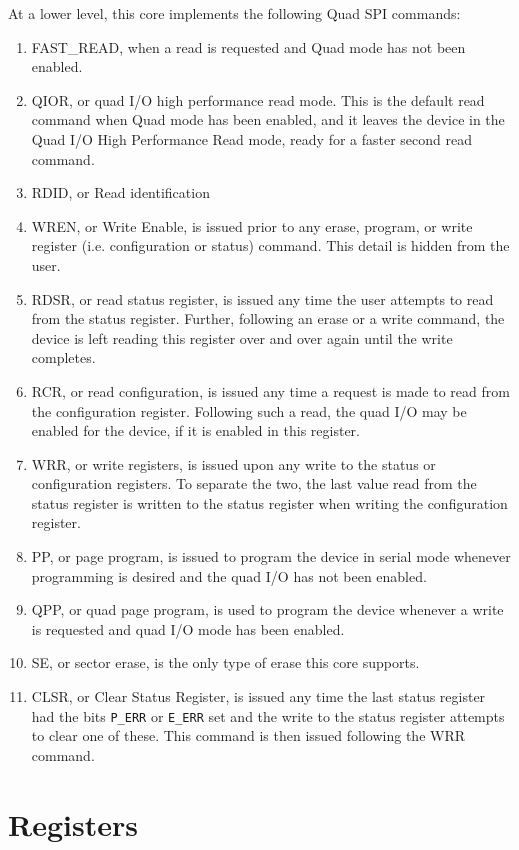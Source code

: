 \documentclass{gqtekspec}
\begin{document}
At a lower level, this core implements the following Quad SPI commands:
\begin{enumerate}
\item FAST\_READ, when a read is requested and Quad mode has not been enabled.
\item QIOR, or quad I/O high performance read mode.  This is the default read
	command when Quad mode has been enabled, and it leaves the device
	in the Quad I/O High Performance Read mode, ready for a faster second
	read command.
\item RDID, or Read identification
\item WREN, or Write Enable, is issued prior to any erase, program, or
		write register (i.e. configuration or status) command.
	This detail is hidden from the user.
\item RDSR, or read status register, is issued any time the user attempts
	to read from the status register.  Further, following an erase or a
	write command, the device is left reading this register over and over
	again until the write completes.
\item RCR, or read configuration, is issued any time a request is made to
	read from the configuration register.  Following such a read, the
	quad I/O may be enabled for the device, if it is enabled in this
	register.
\item WRR, or write registers, is issued upon any write to the status or
	configuration registers.  To separate the two, the last value read
	from the status register is written to the status register when 
	writing the configuration register.
\item PP, or page program, is issued to program the device in serial mode
	whenever programming is desired and the quad I/O has not been enabled.
\item QPP, or quad page program, is used to program the device whenever
	a write is requested and quad I/O mode has been enabled.
\item SE, or sector erase, is the only type of erase this core supports.
\item CLSR, or Clear Status Register, is issued any time the last status
	register had the bits {\tt P\_ERR} or {\tt E\_ERR} set and the
	write to the status register attempts to clear one of these.  This
	command is then issued following the WRR command.
\end{enumerate}

\chapter{Registers}\label{chap:regs}
\end{document}
